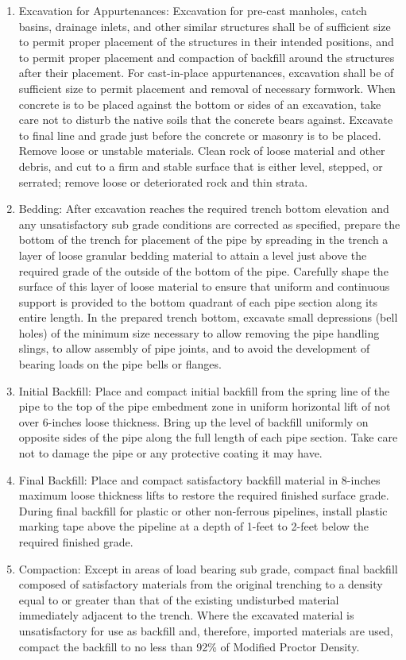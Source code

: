 \documentclass{article}%
\begin{document}
\begin{enumerate}[label=\alph*),start=1]
\item%
Excavation for Appurtenances: Excavation for pre{-}cast manholes, catch basins, drainage inlets, and other similar structures shall be of sufficient size to permit proper placement of the structures in their intended positions, and to permit proper placement and compaction of backfill around the structures after their placement. For cast{-}in{-}place appurtenances, excavation shall be of sufficient size to permit placement and removal of necessary formwork. When concrete is to be placed against the bottom or sides of an excavation, take care not to disturb the native soils that the concrete bears against. Excavate to final line and grade just before the concrete or masonry is to be placed. Remove loose or unstable materials. Clean rock of loose material and other debris, and cut to a firm and stable surface that is either level, stepped, or serrated; remove loose or deteriorated rock and thin strata.%
\item%
Bedding: After excavation reaches the required trench bottom elevation and any unsatisfactory sub grade conditions are corrected as specified, prepare the bottom of the trench for placement of the pipe by spreading in the trench a layer of loose granular bedding material to attain a level just above the required grade of the outside of the bottom of the pipe. Carefully shape the surface of this layer of loose material to ensure that uniform and continuous support is provided to the bottom quadrant of each pipe section along its entire length. In the prepared trench bottom, excavate small depressions (bell holes) of the minimum size necessary to allow removing the pipe handling slings, to allow assembly of pipe joints, and to avoid the development of bearing loads on the pipe bells or flanges.%
\item%
Initial Backfill: Place and compact initial backfill from the spring line of the pipe to the top of the pipe embedment zone in uniform horizontal lift of not over 6{-}inches loose thickness. Bring up the level of backfill uniformly on opposite sides of the pipe along the full length of each pipe section. Take care not to damage the pipe or any protective coating it may have.%
\item%
Final Backfill: Place and compact satisfactory backfill material in 8{-}inches maximum loose thickness lifts to restore the required finished surface grade. During final backfill for plastic or other non{-}ferrous pipelines, install plastic marking tape above the pipeline at a depth of 1{-}feet to 2{-}feet below the required finished grade. %
\item%
Compaction: Except in areas of load bearing sub grade, compact final backfill composed of satisfactory materials from the original trenching to a density equal to or greater than that of the existing undisturbed material immediately adjacent to the trench. Where the excavated material is unsatisfactory for use as backfill and, therefore, imported materials are used, compact the backfill to no less than 92\% of Modified Proctor Density.%
\end{enumerate}
\end{document}
